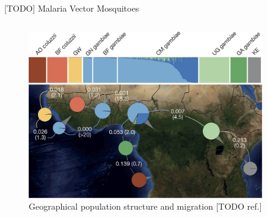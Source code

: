 \documentclass[final,hyperref={pdfpagelabels=false}]{beamer}
\begin{document}
\begin{frame}[t]
\begin{columns}[t]
\begin{column}{.465\textwidth}
\begin{block}{[TODO] Malaria Vector Mosquitoes}
\begin{columns}
\begin{column}{.6\textwidth} %
\centering
\begin{figure}
\includegraphics[width=.95\linewidth]{nature-mosquitoes/fig_2}
\caption{Geographical population structure and migration [TODO ref.]}
\end{figure}
\end{column}

\end{columns} %
\end{block}


\end{column} %

\begin{column}{.03\textwidth}\end{column} %
 
\begin{column}{.465\textwidth} %



\end{column}
\end{columns}
\end{frame}
\end{document}
